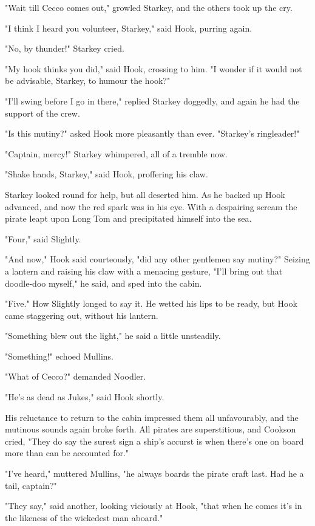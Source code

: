 "Wait till Cecco comes out," growled Starkey, and the others took up the
cry.


"I think I heard you volunteer, Starkey," said Hook, purring again.


"No, by thunder!" Starkey cried.


"My hook thinks you did," said Hook, crossing to him. "I wonder if it
would not be advisable, Starkey, to humour the hook?"


"I'll swing before I go in there," replied Starkey doggedly, and again he
had the support of the crew.


"Is this mutiny?" asked Hook more pleasantly than ever. "Starkey's
ringleader!"


"Captain, mercy!" Starkey whimpered, all of a tremble now.


"Shake hands, Starkey," said Hook, proffering his claw.


Starkey looked round for help, but all deserted him. As he backed up Hook
advanced, and now the red spark was in his eye. With a despairing scream
the pirate leapt upon Long Tom and precipitated himself into the sea.


"Four," said Slightly.


"And now," Hook said courteously, "did any other gentlemen say mutiny?"
Seizing a lantern and raising his claw with a menacing gesture, "I'll
bring out that doodle-doo myself," he said, and sped into the cabin.


"Five." How Slightly longed to say it. He wetted his lips to be ready, but
Hook came staggering out, without his lantern.


"Something blew out the light," he said a little unsteadily.


"Something!" echoed Mullins.


"What of Cecco?" demanded Noodler.


"He's as dead as Jukes," said Hook shortly.


His reluctance to return to the cabin impressed them all unfavourably, and
the mutinous sounds again broke forth. All pirates are superstitious, and
Cookson cried, "They do say the surest sign a ship's accurst is when
there's one on board more than can be accounted for."


"I've heard," muttered Mullins, "he always boards the pirate craft last.
Had he a tail, captain?"


"They say," said another, looking viciously at Hook, "that when he comes
it's in the likeness of the wickedest man aboard."



